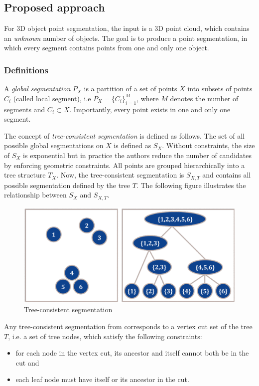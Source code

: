 \subsection{Proposed approach}\label{header-n869}

For 3D object point segmentation, the input is a 3D point cloud, which
contains an \emph{unknown} number of objects. The goal is to produce a
point segmentation, in which every segment contains points from one and
only one object.

\subsubsection{Definitions}\label{header-n871}

A \emph{global segmentation} $P_X$ is a partition of a set of points
$X$ into subsets of points $C_i$ (called local segment), i.e
$P_X = \{C_i\}_{i = 1}^{M}$, where $M$ denotes the number of
segments and $C_i \subset X$. Importantly, every point exists in one
and only one segment.

The concept of \emph{tree-consistent segmentation} is defined as
follows. The set of all possible global segmentations on $X$ is
defined as $S_X$. Without constraints, the size of $S_X$ is
exponential but in practice the authors reduce the number of candidates
by enforcing geometric constraints. All points are grouped
hierarchically into a tree structure $T_X$. Now, the tree-consistent
segmentation is $S_{X,T}$ and contains all possible segmentation
defined by the tree $T$. The following figure illustrates the
relationship between $S_X$ and $S_{X,T}$.

\begin{figure}[h!]
\centering
\includegraphics[width=0.7\linewidth]{images/treesegment.png}
\caption{Tree-consistent segmentation}
\end{figure}

Any tree-consistent segmentation from corresponds to a vertex cut set of
the tree $T$, i.e. a set of tree nodes, which satisfy the following
constraints:

\begin{itemize}
\item
  for each node in the vertex cut, its ancestor and itself cannot both
  be in the cut and
\item
  each leaf node must have itself or its ancestor in the cut. 
\end{itemize}

